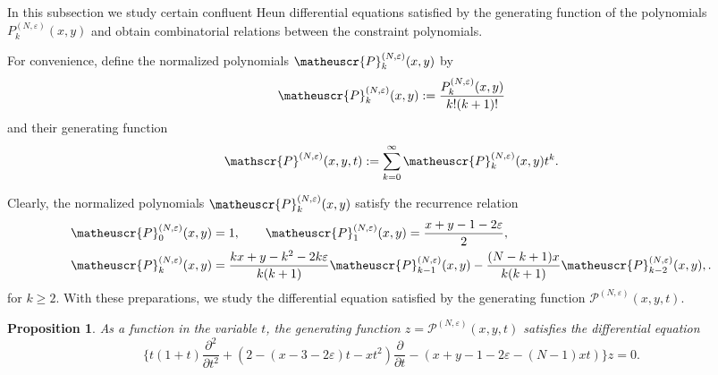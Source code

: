 \documentclass[11pt]{article}
\numberwithin{equation}{section}
\newcommand{\e}{\varepsilon}
\newcommand{\cp}[2]{P^{(#1)}_{#2}} %
\newcommand{\ncp}[2]{\matheuscr{P}^{(#1)}_{#2}} %
\newcommand{\Gncp}[1]{\mathscr{P}^{(#1)}} %
\theoremstyle{plain}
\newtheorem{prop}[thm]{Proposition}
\theoremstyle{definition}
\theoremstyle{remark}
\begin{document}
In this subsection we study certain confluent Heun differential equations satisfied
by the generating function of the polynomials \(\cp{N,\e}{k}(x,y)\) and obtain
combinatorial relations between the constraint polynomials.

For convenience, define the normalized polynomials \(\ncp{N,\e} k(x,y)\) by
\begin{equation*}
  \ncp{N,\e} k(x,y):=\frac{\cp{N,\e}k(x,y)}{k!(k+1)!}
\end{equation*}
and their generating function
\begin{equation*}
  \Gncp{N,\e}(x,y,t):=\sum_{k=0}^\infty \ncp{N,\e}k(x,y)t^k.
\end{equation*}

Clearly, the normalized polynomials \(\ncp{N,\e}{k}(x,y)\) satisfy the recurrence relation
\begin{equation}\label{eq:recurrence of ncp}
  \begin{split}
    \ncp{N,\e}0(x,y)&=1,\qquad
    \ncp{N,\e}1(x,y)=\frac{x+y-1-2\e}2, \\
    \ncp{N,\e}k(x,y)&=\frac{kx+y-k^2-2k\e}{k(k+1)}\ncp{N,\e}{k-1}(x,y)
    -\frac{(N-k+1)x}{k(k+1)}\ncp{N,\e}{k-2}(x,y),.
  \end{split}
\end{equation}
for \(k\geq 2 \). With these preparations, we study the differential equation satisfied by
the generating function \(\Gncp{N,\e}(x,y,t)\).

\begin{prop}\label{lem:diff eq of z}
  As a function in the variable $t$, the generating function $z=\Gncp{N,\e}(x,y,t)$ satisfies the differential equation
  \begin{equation} \label{eq:cheundiff}
    \biggl\{t(1+t)\frac{\partial^2}{\partial t^2}
    +(2-(x-3-2\e)t-xt^2)\frac{\partial}{\partial t}
    -(x+y-1-2\e-(N-1)xt)\biggr\}z=0.
  \end{equation}
\end{prop}
\end{document}
